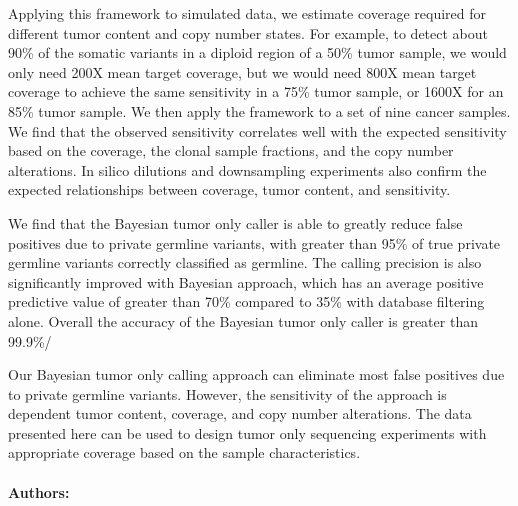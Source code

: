 Applying this framework to simulated data, we estimate coverage required for different
tumor content and copy number states. For example, to detect about 90\% of the
somatic variants in a diploid region of a 50\% tumor sample, we would only need 200X
mean target coverage, but we would need 800X mean target coverage to achieve the
same sensitivity in a 75\% tumor sample, or 1600X for an 85\% tumor sample. We then
apply the framework to a set of nine cancer samples. We find that the observed
sensitivity correlates well with the expected sensitivity based on the coverage, the clonal
sample fractions, and the copy number alterations. In silico dilutions and downsampling
experiments also confirm the expected relationships between coverage, tumor content,
and sensitivity.

We find that the Bayesian tumor only caller is able to greatly reduce false positives due
to private germline variants, with greater than 95\% of true private germline variants
correctly classified as germline. The calling precision is also significantly improved with
Bayesian approach, which has an average positive predictive value of greater than 70\%
compared to 35\% with database filtering alone. Overall the accuracy of the Bayesian
tumor only caller is greater than 99.9\%/


Our Bayesian tumor only calling approach can eliminate most false positives due to
private germline variants. However, the sensitivity of the approach is dependent tumor
content, coverage, and copy number alterations. The data presented here can be used
to design tumor only sequencing experiments with appropriate coverage based on the
sample characteristics.

\noindent \paragraph{Authors:} 


